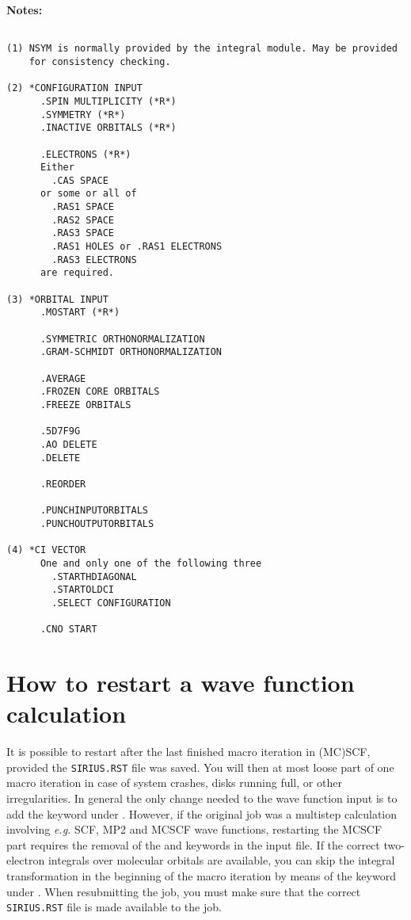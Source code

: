 {\bf Notes:}

\begin{verbatim}

(1) NSYM is normally provided by the integral module. May be provided
    for consistency checking.

(2) *CONFIGURATION INPUT
      .SPIN MULTIPLICITY (*R*)
      .SYMMETRY (*R*)
      .INACTIVE ORBITALS (*R*)

      .ELECTRONS (*R*)
      Either
        .CAS SPACE
      or some or all of
        .RAS1 SPACE
        .RAS2 SPACE
        .RAS3 SPACE
        .RAS1 HOLES or .RAS1 ELECTRONS
        .RAS3 ELECTRONS
      are required.

(3) *ORBITAL INPUT
      .MOSTART (*R*)

      .SYMMETRIC ORTHONORMALIZATION
      .GRAM-SCHMIDT ORTHONORMALIZATION

      .AVERAGE
      .FROZEN CORE ORBITALS
      .FREEZE ORBITALS

      .5D7F9G
      .AO DELETE
      .DELETE

      .REORDER

      .PUNCHINPUTORBITALS
      .PUNCHOUTPUTORBITALS

(4) *CI VECTOR
      One and only one of the following three
        .STARTHDIAGONAL
        .STARTOLDCI
        .SELECT CONFIGURATION

      .CNO START
\end{verbatim}

\pagebreak[3]
\section{\label{sec:ig_restart} How to restart a wave function calculation}

It is possible to restart after the last finished
macro iteration in (MC)SCF, provided the \verb|SIRIUS.RST|
file was saved.  You will then at most
loose part of one macro iteration in case of system crashes, disks
running full, or other irregularities. \noindent In general the
only change needed to the wave function input is to add the
 keyword under . However, if the
original job was a multistep calculation involving {\it e.g.\/} SCF,
MP2 and MCSCF wave functions, restarting the MCSCF part requires the
removal of the  and  keywords in the input
file. If the correct
two-electron integrals over molecular orbitals are available, you
can skip the integral transformation 
in the beginning of the macro iteration by means
of the  keyword under
. When resubmitting the job, you must make
sure that the correct \verb|SIRIUS.RST| file is
made available to the job.

